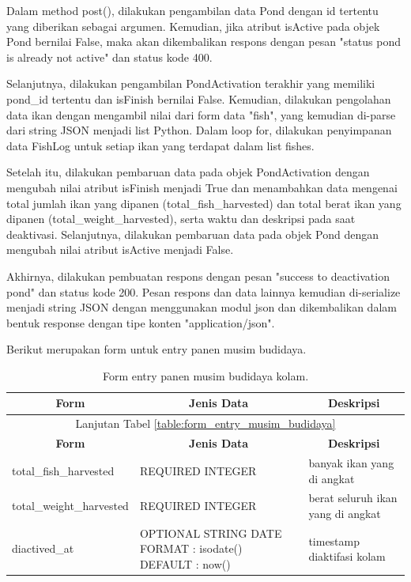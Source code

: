 \begin{enumerate}[1.]
Dalam method post(), dilakukan pengambilan data Pond dengan id tertentu yang diberikan sebagai argumen. Kemudian, jika atribut isActive pada objek Pond bernilai False, maka akan dikembalikan respons dengan pesan "status pond is already not active" dan status kode 400.

Selanjutnya, dilakukan pengambilan PondActivation terakhir yang memiliki pond\_id tertentu dan isFinish bernilai False. Kemudian, dilakukan pengolahan data ikan dengan mengambil nilai dari form data "fish", yang kemudian di-parse dari string JSON menjadi list Python. Dalam loop for, dilakukan penyimpanan data FishLog untuk setiap ikan yang terdapat dalam list fishes.

Setelah itu, dilakukan pembaruan data pada objek PondActivation dengan mengubah nilai atribut isFinish menjadi True dan menambahkan data mengenai total jumlah ikan yang dipanen (total\_fish\_harvested) dan total berat ikan yang dipanen (total\_weight\_harvested), serta waktu dan deskripsi pada saat deaktivasi. Selanjutnya, dilakukan pembaruan data pada objek Pond dengan mengubah nilai atribut isActive menjadi False.

Akhirnya, dilakukan pembuatan respons dengan pesan "success to deactivation pond" dan status kode 200. Pesan respons dan data lainnya kemudian di-serialize menjadi string JSON dengan menggunakan modul json dan dikembalikan dalam bentuk response dengan tipe konten "application/json".

Berikut merupakan form untuk entry panen musim budidaya.

\begin{longtable}{| l | p{5cm} | p{5cm} |}
\caption{Form entry panen musim budidaya kolam.\label{table:form_entry_panen_musim_budidaya}}\\

\hline
\multicolumn{1}{|c|}{\textbf{Form}} & \multicolumn{1}{|c|}{\textbf{Jenis Data}} & \multicolumn{1}{|c|}{\textbf{Deskripsi}}\\
\hline
\endfirsthead

\hline
\multicolumn{3}{|c|}{Lanjutan Tabel \ref{table:form_entry_musim_budidaya}}\\
\hline
\multicolumn{1}{|c|}{\textbf{Form}} & \multicolumn{1}{|c|}{\textbf{Jenis Data}} & \multicolumn{1}{|c|}{\textbf{Deskripsi}}\\
\hline
\endhead


total\_fish\_harvested   & REQUIRED INTEGER                                        & banyak ikan yang di angkat        \\ \hline
total\_weight\_harvested & REQUIRED INTEGER                                        & berat seluruh ikan yang di angkat \\ \hline
diactived\_at            & OPTIONAL STRING DATE FORMAT : isodate() DEFAULT : now() & timestamp diaktifasi kolam        \\ \hline


\end{longtable}
\end{enumerate}
